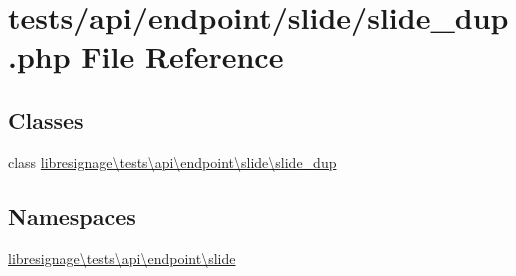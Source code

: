\hypertarget{tests_2api_2endpoint_2slide_2slide__dup_8php}{}\section{tests/api/endpoint/slide/slide\+\_\+dup.php File Reference}
\label{tests_2api_2endpoint_2slide_2slide__dup_8php}
\subsection*{Classes}
\begin{DoxyCompactItemize}
\item 
class \hyperlink{classlibresignage_1_1tests_1_1api_1_1endpoint_1_1slide_1_1slide__dup}{libresignage\textbackslash{}tests\textbackslash{}api\textbackslash{}endpoint\textbackslash{}slide\textbackslash{}slide\+\_\+dup}
\end{DoxyCompactItemize}
\subsection*{Namespaces}
\begin{DoxyCompactItemize}
\item 
 \hyperlink{namespacelibresignage_1_1tests_1_1api_1_1endpoint_1_1slide}{libresignage\textbackslash{}tests\textbackslash{}api\textbackslash{}endpoint\textbackslash{}slide}
\end{DoxyCompactItemize}
